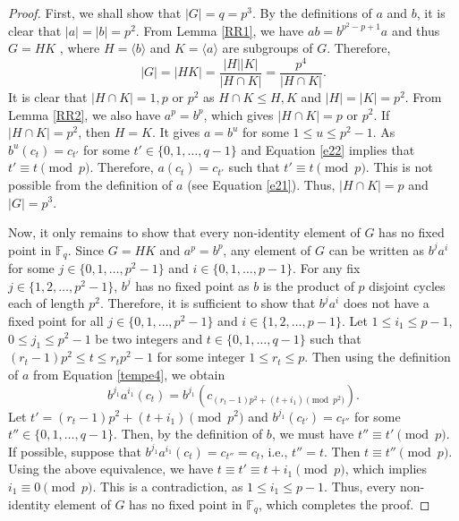 \documentclass[11pt]{amsart}
\theoremstyle{plain}
\numberwithin{equation}{section}
\def\F{{\mathbb F}}
\begin{document}
\begin{proof}
First, we shall show that $|G|=q=p^3$. By the definitions of $a$ and $b$, it is clear that $|a|=|b|=p^2$. From Lemma \ref{RR1}, we have $ab=b^{p^2-p+1}a$ and thus $G=HK$ , where $H=\langle b \rangle$ and $K=\langle a \rangle $ are subgroups of $G$. Therefore,
\[
|G|=|HK|=\dfrac{|H||K|}{|H \cap K|}=\dfrac{p^4}{|H \cap K|}.
\]
It is clear that $|H \cap K|=1,p$ or $p^2$ as $H \cap K \leq H,K$ and $|H|=|K|=p^2$. From Lemma \ref{RR2}, we also have $a^p=b^p$, which gives $|H \cap K| = p$ or $p^2$. If $|H \cap K| = p^2$, then $H=K$. It gives $a=b^u$ for some
$1 \leq u \leq p^2-1$. As $b^u(c_t)=c_{t'}$ for some $t' \in \{0,1,\ldots,q-1\}$ and Equation \eqref{e22} implies that $t'\equiv t \pmod  p$. Therefore, $a(c_t)=c_{t'}$ such that $t'\equiv t \pmod  p$. This is not possible from the definition of $a$ (see Equation \eqref{e21}). Thus, $|H \cap K| = p$ and $|G|=p^3$. 


Now, it only remains to show that every non-identity element of $G$ has no fixed point in $\F_q$. Since $G=HK$ and $a^p=b^p$, any element of $G$ can be written as $b^{j}a^{i}$ for some $j\in \{0,1,\ldots,p^2-1\}$ and $i \in \{0,1,\ldots,p-1\}$. For any fix $j\in \{1,2,\ldots,p^2-1\}$, $b^j$ has no fixed point as $b$ is the product of $p$ disjoint cycles each of length $p^2$. Therefore, it is sufficient to show that $b^{j}a^{i}$ does not have a fixed point for all $j\in \{0,1,\ldots,p^2-1\}$ and $i \in \{1,2,\ldots,p-1\}$. Let $1 \leq i_1 \leq p-1$, $0 \leq j_1 \leq p^2-1$ be two integers and $t \in \{0,1,\ldots,q-1\}$ such that $(r_t-1)p^2 \leq t \leq r_tp^2-1$ for some integer $1 \leq r_t \leq p$. Then using the definition of $a$ from Equation \eqref{tempe4}, we obtain 
\[
b^{j_1}a^{i_1}(c_t)=b^{j_1}(c_{(r_t-1)p^2+(t+i_1) \pmod {p^2}}).
\]
 Let $t'=(r_t-1)p^2+(t+i_1) \pmod {p^2}$ and $b^{j_1}(c_{t'})=c_{t''}$ for some $t'' \in \{0,1,\ldots,q-1\}$. Then, by the definition of $b$, we must have $t'' \equiv t' \pmod  p$. If possible, suppose that $b^{j_1}a^{i_1}(c_t)=c_{t''}=c_t$, i.e., $t''=t$. Then $t \equiv t'' \pmod  p$. Using the above equivalence, we have $t \equiv t' \equiv t+i_1 \pmod  p$, which implies $i_1 \equiv 0 \pmod  p$. This is a contradiction, as $1 \leq i_1 \leq p-1$. Thus, every non-identity element of $G$ has no fixed point in $\F_q$, which completes the proof.
\end{proof}
\end{document}
